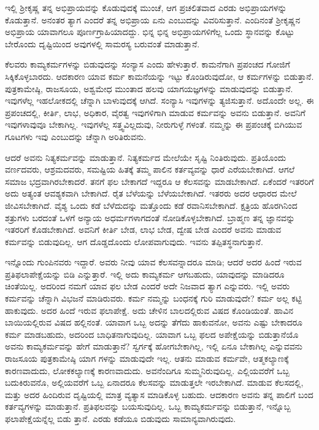 ಇಲ್ಲಿ ಶ್ರೀಕೃಷ್ಣ ತನ್ನ ಅಭಿಪ್ರಾಯವನ್ನು ಕೊಡುವುದಕ್ಕೆ ಮುಂಚೆ, ಆಗ ಪ್ರಚಲಿತವಾದ ಎರಡು ಅಭಿಪ್ರಾಯಗಳನ್ನು ಕೊಡುತ್ತಾನೆ. ಅನಂತರ ತ್ಯಾಗ ಎಂದರೆ ತನ್ನ ಅಭಿಪ್ರಾಯ ಏನು ಎಂಬುದನ್ನು ವಿವರಿಸುತ್ತಾನೆ. ಎಂದಿನಂತೆ ಶ್ರೀಕೃಷ್ಣನ ಅಭಿಪ್ರಾಯ ಯಾವಾಗಲೂ ಪೂರ್ಣಗ್ರಾಹಿಯಾದದ್ದು. ಭಿನ್ನ ಭಿನ್ನ ಅಭಿಪ್ರಾಯಗಳಿಗೆಲ್ಲ ಒಂದು ಸ್ಥಾನವನ್ನು ಕೊಟ್ಟು ಬೇರೊಂದು ದೃಷ್ಟಿಯಿಂದ ಅವುಗಳಲ್ಲಿ ಸಾಮರಸ್ಯ ಬರುವಂತೆ ಮಾಡುತ್ತಾನೆ.

ಕೆಲವರು ಕಾಮ್ಯಕರ್ಮಗಳನ್ನು ಬಿಡುವುದನ್ನು ಸಂನ್ಯಾಸ ಎಂದು ಹೇಳುತ್ತಾರೆ. ಕಾಮನೆಗಾಗಿ ಪ್ರಪಂಚದ ಗೋಜಿಗೆ ಸಿಕ್ಕಿಕೊಳ್ಳಬಾರದು. ಆದಕಾರಣ ಯಾವ ಕರ್ಮ ಕಾಮನೆಯನ್ನು ಇಟ್ಟು ಕೊಂಡಿರುವುದೋ, ಆ ಕರ್ಮಗಳನ್ನು ಬಿಡುತ್ತಾನೆ. ಪುತ್ರಕಾಮೇಷ್ಠಿ, ರಾಜಸೂಯ, ಅಶ್ವಮೇಧ ಮುಂತಾದ ಹಲವು ಯಾಗಯಜ್ಞಗಳನ್ನು ಮಾಡುವುದನ್ನು ಬಿಡುತ್ತಾನೆ. ಇವುಗಳೆಲ್ಲ ಇಹಲೋಕದಲ್ಲಿ ಚೆನ್ನಾಗಿ ಬಾಳುವುದಕ್ಕೆ ಆಗಿದೆ. ಸಂನ್ಯಾಸಿ ಇವುಗಳನ್ನು ತ್ಯಜಿಸುತ್ತಾನೆ. ಅದೊಂದೇ ಅಲ್ಲ. ಈ ಪ್ರಪಂಚದಲ್ಲಿ, ಕೀರ್ತಿ, ಲಾಭ, ಅಧಿಕಾರ, ವೈರತ್ವ ಇವುಗಳಿಗಾಗಿ ಮಾಡುವ ಕರ್ಮವನ್ನು ಅವನು ಬಿಡುತ್ತಾನೆ. ಅವನಿಗೆ ಇವುಗಳಾವುವೂ ಬೇಕಾಗಿಲ್ಲ. ಇವುಗಳೆಲ್ಲ ಸತ್ತ್ವವಿಲ್ಲದುವು, ನೀರುಗುಳ್ಳೆ ಗಳಂತೆ. ನಮ್ಮನ್ನು ಈ ಪ್ರಪಂಚಕ್ಕೆ ಬಿಗಿಯುವ ಗೂಟಗಳು ಇವು ಎಂಬುದನ್ನು ಚೆನ್ನಾಗಿ ಅರಿತಿರುವನು.

ಆದರೆ ಅವನು ನಿತ್ಯಕರ್ಮವನ್ನು ಮಾಡುತ್ತಾನೆ. ನಿತ್ಯಕರ್ಮದ ಮೇಲೆಯೇ ಸೃಷ್ಟಿ ನಿಂತಿರುವುದು. ಪ್ರತಿಯೊಂದು ವರ್ಣದವರು, ಆಶ್ರಮದವರು, ಸಮಷ್ಟಿಯ ಹಿತಕ್ಕೆ ತಮ್ಮ ಪಾಲಿನ ಕರ್ತವ್ಯವನ್ನು ಧಾರೆ ಎರೆಯಬೇಕಾಗಿದೆ. ಆಗಲೆ ಸಮಾಜ ಭದ್ರವಾಗಿರಬೇಕಾದರೆ. ತನಗೆ ಫಲ ಬೇಕಾಗದೆ ಇದ್ದರೂ ಆ ಕೆಲಸವನ್ನು ಮಾಡಬೇಕಾಗಿದೆ. ಏಕೆಂದರೆ ಇತರರಿಗೆ ಅದು ಅತ್ಯಂತ ಆವಶ್ಯಕವಾಗಿ ಬೇಕಾಗಿದೆ. ರೈತ ಬೆಳೆಯನ್ನು ಬೆಳೆಯಬೇಕಾಗಿದೆ. ಇತರರು ಅದರ ಆಧಾರದ ಮೇಲೆ ಜೀವಿಸಬೇಕಾಗಿದೆ. ವೈಶ್ಯ ಒಂದು ಕಡೆ ಬೆಳೆದುದನ್ನು ಮತ್ತೊಂದು ಕಡೆ ರವಾನಿಸಬೇಕಾಗಿದೆ. ಕ್ಷತ್ರಿಯ ಹೊರಗಿನಿಂದ ಶತ್ರುಗಳು ಬರದಂತೆ ಒಳಗೆ ಅನ್ಯಾಯ ಅಧರ್ಮಗಳಾಗದಂತೆ ನೋಡಿಕೊಳ್ಳಬೇಕಾಗಿದೆ. ಬ್ರಾಹ್ಮಣ ತನ್ನ ಜ್ಞಾನವನ್ನು ಇತರರಿಗೆ ಕೊಡಬೇಕಾಗಿದೆ. ಅವನಿಗೆ ಕೀರ್ತಿ ಬೇಡ, ಲಾಭ ಬೇಡ, ದ್ವೇಷ ಬೇಡ ಎಂದರೆ ಅವನು ಮಾಡುವ ಕರ್ಮವನ್ನು ಬಿಡುವುದಿಲ್ಲ. ಆಗ ದೊಡ್ಡದೊಂದು ಲೋಪವಾಗುವುದು. ಇವನು ತಪ್ಪಿತಸ್ಥನಾಗುತ್ತಾನೆ.

ಇನ್ನೊಂದು ಗುಂಪಿನವರು ಇದ್ದಾರೆ. ಅವರು ನೀವು ಯಾವ ಕೆಲಸವನ್ನಾದರೂ ಮಾಡಿ; ಆದರೆ ಅದರ ಹಿಂದೆ ಇರುವ ಪ್ರತಿಫಲಾಪೇಕ್ಷೆಯನ್ನು ಬಿಡಿ ಎನ್ನುತ್ತಾರೆ. ಇಲ್ಲಿ ಅದು ಕಾಮ್ಯಕರ್ಮ ಆಗಬಹುದು, ಯಾವುದನ್ನು ಮಾಡಿದರೂ ಚಿಂತೆಯಿಲ್ಲ. ಅದರಿಂದ ನಮಗೆ ಯಾವ ಫಲ ಬೇಡ ಎಂದರೆ ಅದೇ ನಿಜವಾದ ತ್ಯಾಗ ಎನ್ನುವರು. ಇಲ್ಲಿ ಅವರು ಕರ್ಮವನ್ನು ಚೆನ್ನಾಗಿ ವಿಭಜನೆ ಮಾಡಿರುವರು. ಕರ್ಮ ನಮ್ಮನ್ನು ಬಂಧನಕ್ಕೆ ಗುರಿ ಮಾಡುವುದೇ? ಕರ್ಮ ಅಲ್ಲ ಕಟ್ಟಿ ಹಾಕುವುದು. ಅದರ ಹಿಂದೆ ಇರುವ ಫಲಾಪೇಕ್ಷೆ. ಅದು ಚೇಳಿನ ಬಾಲದಲ್ಲಿರುವ ವಿಷದ ಕೊಂಡಿಯಂತೆ. ಹಾವಿನ ಬಾಯಿಯಲ್ಲಿರುವ ವಿಷದ ಹಲ್ಲಿನಂತೆ. ಯಾವಾಗ ಒಬ್ಬ ಅದನ್ನು ತೆಗೆದು ಹಾಕುವನೋ, ಅವನು ಎಷ್ಟು ಬೇಕಾದರೂ ಕರ್ಮ ಮಾಡಬಹುದು, ಅದರಿಂದ ಬಾಧಿತನಾಗುವುದಿಲ್ಲ. ಯಾವಾಗ ಒಬ್ಬ ಫಲದ ಅಪೇಕ್ಷೆಯನ್ನು ಬಿಡುತ್ತಾನೆಯೊ ಅವನು ಕಾಮ್ಯಕರ್ಮವನ್ನು ಹೇಗೆ ಮಾಡುತ್ತಾನೆ? ಸ್ವರ್ಗಕ್ಕೆ ಹೋಗಬೇಕಾಗಿಲ್ಲ, ಇಲ್ಲಿ ಏನೂ ಬೇಕಾಗಿಲ್ಲ ಎನ್ನುವವನು ರಾಜಸೂಯ ಪುತ್ರಕಾಮೇಷ್ಠಿ ಯಾಗ ಗಳನ್ನು ಮಾಡುವುದೇ ಇಲ್ಲ. ಆತನು ಮಾಡುವ ಕರ್ಮವೇ, ಆತ್ಮಕಲ್ಯಾಣಕ್ಕೆ ಕಾರಣವಾದುದು, ಲೋಕಕಲ್ಯಾಣಕ್ಕೆ ಕಾರಣವಾದುದು. ಅವನೆಂದಿಗೂ ಸುಮ್ಮನಿರುವುದಿಲ್ಲ. ಎಲ್ಲಿಯವರೆಗೆ ಒಬ್ಬ ಬದುಕಿರುವನೊ, ಅಲ್ಲಿಯವರೆಗೆ ಒಬ್ಬ ಏನಾದರೂ ಕೆಲಸವನ್ನು ಮಾಡುತ್ತಲೇ ಇರಬೇಕಾಗಿದೆ. ಮಾಡುವ ಕೆಲಸದಲ್ಲಿ, ಮತ್ತು ಅದರ ಹಿಂದಿರುವ ದೃಷ್ಟಿಯಲ್ಲಿ ಮಾತ್ರ ವ್ಯತ್ಯಾಸ ಮಾಡಿಕೊಳ್ಳ ಬಹುದು. ಆದಕಾರಣ ಅವನು ತನ್ನ ಪಾಲಿಗೆ ಬಂದ ಕರ್ತವ್ಯಗಳನ್ನು ಮಾಡುತ್ತಾನೆ. ಪ್ರತಿಫಲವನ್ನು ಬಯಸುವುದಿಲ್ಲ. ಒಬ್ಬ ಕಾಮ್ಯಕರ್ಮವನ್ನು ಬಿಡುತ್ತಾನೆ, ಇನ್ನೊಬ್ಬ ಫಲಾಪೇಕ್ಷೆಯನ್ನೆಲ್ಲ ಬಿಡು ತ್ತಾನೆ. ಎರಡು ಕಡೆಯೂ ಬಿಡುವುದು ಸಾಮಾನ್ಯವಾಗಿರುವುದು.


